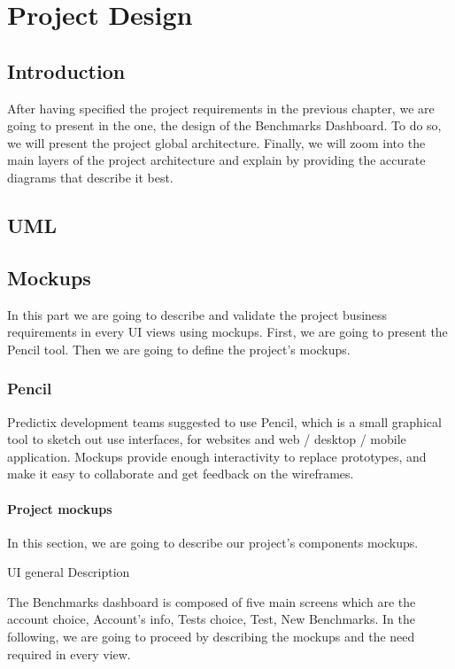 \chapter{Project Design}

\section*{Introduction}
After having specified the project requirements in the  previous chapter, we are
going to present in the one,  the design of the Benchmarks Dashboard. To do so,
we will present the project global architecture. Finally, we will zoom into the
main layers of the project architecture and explain by providing the accurate
diagrams that describe it best.

\section{UML}

\section{Mockups}
In this part we are going to describe and validate the project business
requirements in every UI views using mockups. First, we are going to present the
Pencil tool. Then we are going to define the project's mockups.

\subsection{Pencil}
Predictix development teams suggested to use Pencil, which is a small graphical
tool to sketch out use interfaces, for websites and web / desktop / mobile
application. Mockups provide enough interactivity to replace prototypes, and
make it easy to collaborate and get feedback on the wireframes.

\subsubsection{Project mockups}
In this section, we are going to describe our project's components mockups.

UI general Description

The Benchmarks dashboard is composed of five main screens which are the account
choice, Account's info, Tests choice, Test, New Benchmarks. In the following,
we are going to proceed by describing the mockups and the need required in every
view.

